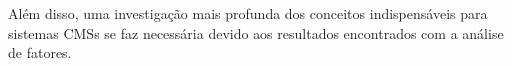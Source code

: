 Além disso, uma investigação mais profunda dos conceitos indispensáveis para sistemas CMSs se faz necessária devido aos resultados encontrados com a análise de fatores.  



%
%
%
%
%
%

